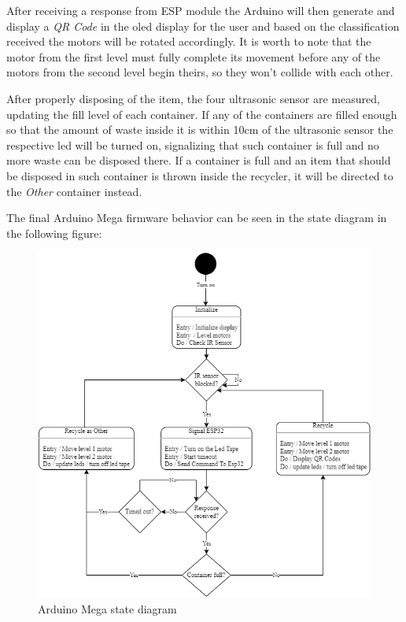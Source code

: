 \documentclass[a4paper,11pt]{article}
\begin{document}
After receiving a response from ESP module the Arduino will then generate and display a \textit{QR Code} in the oled display for the user and based on the classification received the motors will be rotated accordingly. It is worth to note that the motor from the first level must fully complete its movement before any of the motors from the second level begin theirs, so they won't collide with each other.

After properly disposing of the item, the four ultrasonic sensor are measured, updating the fill level of each container. If any of the containers are filled enough so that the amount of waste inside it is within 10cm of the ultrasonic sensor the respective led will be turned on, signalizing that such container is full and no more waste can be disposed there. If a container is full and an item that should be disposed in such container is thrown inside the recycler, it will be directed to the \textit{Other} container instead.

The final Arduino Mega firmware behavior can be seen in the state diagram in the following figure:

\begin{figure}[H]
  \centering
  \includegraphics[width=12cm]{Figures/State chart Arduino Mega.png}
  \caption{\small{Arduino Mega state diagram}}
  \label{fig:arduinoState}
\end{figure}
\end{document}
